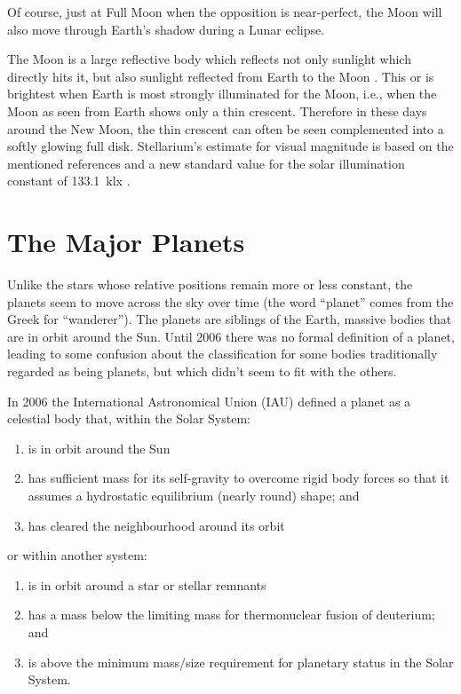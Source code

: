 Of course, just at Full Moon when the opposition is near-perfect, the
Moon will also move through Earth's shadow during a Lunar eclipse.

The Moon is a large reflective body which reflects not only sunlight
which directly hits it, but also sunlight reflected from Earth to the
Moon \citep{Agrawal:2016}. This  or
 is brightest when Earth is most strongly
illuminated for the Moon, i.e., when the Moon as seen from Earth shows
only a thin crescent. Therefore in these days around the New Moon, the
thin crescent can often be seen complemented into a softly glowing
full disk.  Stellarium's estimate for visual
magnitude is based on the mentioned references and a new standard 
value for the solar illumination constant of 133.1~klx \citep{Ashdown:2019}.


\section{The Major Planets}
\label{sec:Planets}

Unlike the stars whose relative positions remain more or less constant,
the planets seem to move across the sky over time (the word ``planet''
comes from the Greek for ``wanderer''). The planets are siblings of the Earth,
massive bodies that are in orbit around the Sun. Until 2006 there was no
formal definition of a planet, leading to some confusion about the
classification for some bodies traditionally regarded as being planets, but
which didn't seem to fit with the others.

In 2006 the International Astronomical Union (IAU) defined a planet as a
celestial body that, within the Solar System:

\begin{enumerate}
\item
  is in orbit around the Sun
\item
  has sufficient mass for its self-gravity to overcome rigid body forces
  so that it assumes a hydrostatic equilibrium (nearly round) shape; and
\item
  has cleared the neighbourhood around its orbit
\end{enumerate}

or within another system:

\begin{enumerate}
\item
  is in orbit around a star or stellar remnants
\item
  has a mass below the limiting mass for thermonuclear fusion of
  deuterium; and
\item
  is above the minimum mass/size requirement for planetary status in the
  Solar System.
\end{enumerate}

